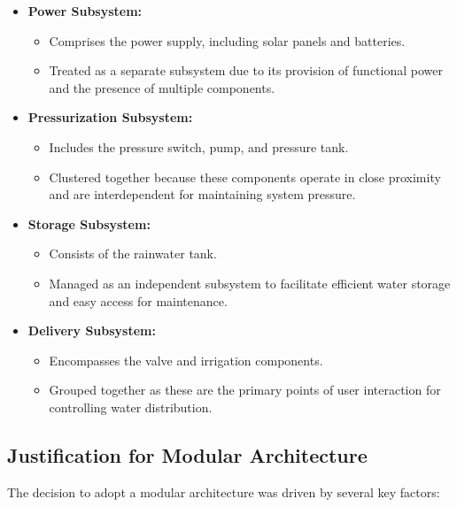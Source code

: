 \documentclass[12pt]{article}
\begin{document}
\begin{itemize}
    \item \textbf{Power Subsystem:}
    \begin{itemize}
        \item Comprises the power supply, including solar panels and batteries.
        \item Treated as a separate subsystem due to its provision of functional power and the presence of multiple components.
    \end{itemize}
    
    \item \textbf{Pressurization Subsystem:}
    \begin{itemize}
        \item Includes the pressure switch, pump, and pressure tank.
        \item Clustered together because these components operate in close proximity and are interdependent for maintaining system pressure.
    \end{itemize}
    
    \item \textbf{Storage Subsystem:}
    \begin{itemize}
        \item Consists of the rainwater tank.
        \item Managed as an independent subsystem to facilitate efficient water storage and easy access for maintenance.
    \end{itemize}
    
    \item \textbf{Delivery Subsystem:}
    \begin{itemize}
        \item Encompasses the valve and irrigation components.
        \item Grouped together as these are the primary points of user interaction for controlling water distribution.
    \end{itemize}
\end{itemize}

\subsection{Justification for Modular Architecture}
\label{subsec:justification_modular}

The decision to adopt a modular architecture was driven by several key factors:
\end{document}
